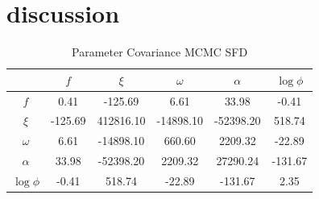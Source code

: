 \documentclass[apj]{aastex62}
\begin{document}
\section{discussion}

{}

\begin{table}
    \centering
    \caption{Parameter Covariance MCMC SFD}
    \label{tab:parameter_covariance}
    \begin{tabular}{c|ccccc}
         & $f$ & $\xi$ & $\omega$ & $\alpha$ & $\log \phi$\\ 
        \hline
              $f$ &  0.41 & -125.69 &  6.61 & 33.98 & -0.41 \\ 
            $\xi$ & -125.69 & 412816.10 & -14898.10 & -52398.20 & 518.74 \\ 
         $\omega$ &  6.61 & -14898.10 & 660.60 & 2209.32 & -22.89 \\ 
         $\alpha$ & 33.98 & -52398.20 & 2209.32 & 27290.24 & -131.67 \\ 
        $\log \phi$ & -0.41 & 518.74 & -22.89 & -131.67 &  2.35 \\ 
        \hline
    \end{tabular}
\end{table}
\end{document}
